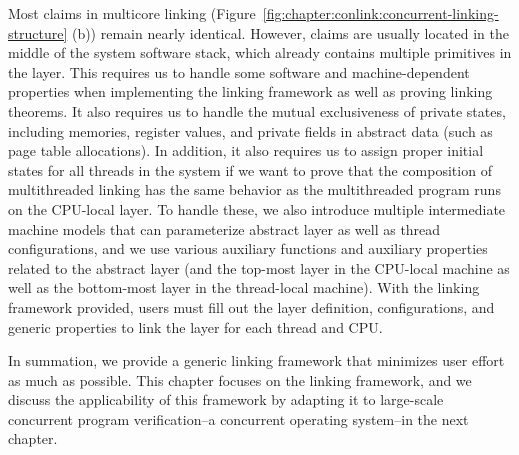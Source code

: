 Most claims in multicore linking (Figure~\ref{fig:chapter:conlink:concurrent-linking-structure} (b)) 
remain nearly identical. However, claims are usually located in the middle of the system software stack, which already contains multiple primitives in the layer. 
This requires us to handle some software and machine-dependent properties when implementing the linking framework as well as proving linking theorems. It also requires us to handle the mutual exclusiveness of private states, including memories, register values, and private fields in abstract data (such as page table allocations). 
In addition, it also requires us to assign proper initial states for all threads in the system if we want to prove that the composition of multithreaded linking has the same behavior as the multithreaded program runs on the 
CPU-local layer. 
To handle these, we also introduce multiple intermediate machine models that can parameterize abstract layer as well as thread configurations, 
and we use various auxiliary functions and auxiliary properties related to the abstract layer (and the top-most layer in the CPU-local machine as well as the bottom-most layer in the thread-local machine). 
With the linking framework provided, users must fill out the layer definition, configurations, and generic properties to link the layer for each thread and CPU.


In summation, we provide a generic linking framework that minimizes user effort as much as possible. This chapter focuses on the linking framework, and we discuss the applicability of this framework by adapting it to large-scale concurrent program verification--a concurrent operating system--in the next chapter.



